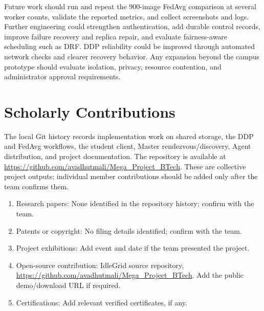 \documentclass{article}
\begin{document}
Future work should run and repeat the 900-image FedAvg comparison at several worker counts, validate the reported metrics, and collect screenshots and logs. Further engineering could strengthen authentication, add durable control records, improve failure recovery and replica repair, and evaluate fairness-aware scheduling such as DRF. DDP reliability could be improved through automated network checks and clearer recovery behavior. Any expansion beyond the campus prototype should evaluate isolation, privacy, resource contention, and administrator approval requirements.

\pagebreak

\section{Scholarly Contributions}
The local Git history records implementation work on shared storage, the DDP and FedAvg workflows, the student client, Master rendezvous/discovery, Agent distribution, and project documentation. The repository is available at \url{https://github.com/avadhutmali/Mega_Project_BTech}. These are collective project outputs; individual member contributions should be added only after the team confirms them.
\begin{enumerate}
\item Research papers: None identified in the repository history; confirm with the team.
\item Patents or copyright: No filing details identified; confirm with the team.
\item Project exhibitions: Add event and date if the team presented the project.
\item Open-source contribution: IdleGrid source repository, \url{https://github.com/avadhutmali/Mega_Project_BTech}. Add the public demo/download URL if required.
\item Certifications: Add relevant verified certificates, if any.
\end{enumerate}


	\pagebreak
	
\end{document}
